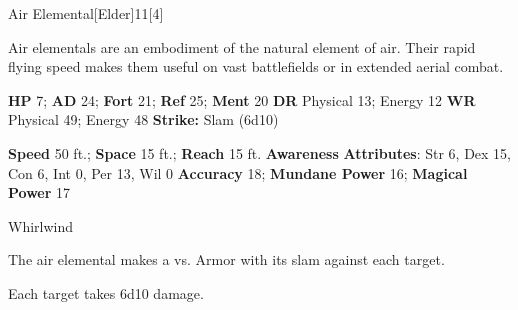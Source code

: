   \begin{monsection}{Air Elemental}[Elder]{11}[4]
    \vspace{-1em}\vspace{-1em}
    \vspace{0em}

    
    Air elementals are an embodiment of the natural element of air.
    Their rapid flying speed makes them useful on vast battlefields or in extended aerial combat.
  

    \begin{spellcontent}
      \begin{spelltargetinginfo}
        \pari \textbf{HP} 7;
          \textbf{AD} 24;
          \textbf{Fort} 21;
          \textbf{Ref} 25;
          \textbf{Ment} 20
        \pari \textbf{DR} Physical 13; Energy 12
        \pari \textbf{WR} Physical 49; Energy 48
        \pari \textbf{Strike:}
            Slam  (6d10)
      \end{spelltargetinginfo}
    \end{spellcontent}
    \begin{monsterfooter}
      \pari \textbf{Speed} 50 ft.;
        \textbf{Space} 15 ft.;
        \textbf{Reach} 15 ft.
      \pari \textbf{Awareness} 
      \pari \textbf{Attributes}:
        Str 6, Dex 15,
        Con 6, Int 0,
        Per 13, Wil 0
      \pari \textbf{Accuracy} 18;
        \textbf{Mundane Power} 16;
      \textbf{Magical Power} 17
    \end{monsterfooter}
  \end{monsection}
  \begin{freeability}{Whirlwind}
      
      The air elemental makes a 
         vs. Armor
        with its slam against each target.
    
    \hit Each target takes 6d10  damage.
    \end{freeability}
  

